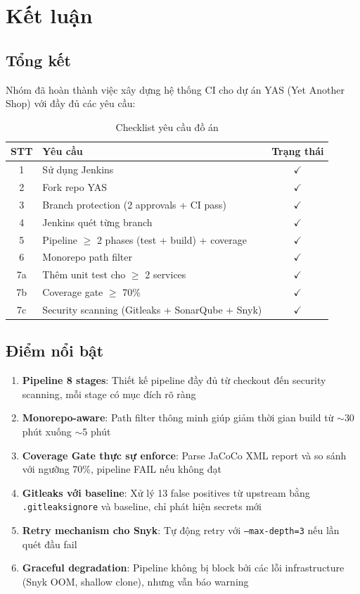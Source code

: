 \section{Kết luận}

\subsection{Tổng kết}
Nhóm đã hoàn thành việc xây dựng hệ thống CI cho dự án YAS (Yet Another Shop) với đầy đủ các yêu cầu:

\begin{table}[H]
\centering
\caption{Checklist yêu cầu đồ án}
\begin{tabular}{|c|l|c|}
\hline
\textbf{STT} & \textbf{Yêu cầu} & \textbf{Trạng thái} \\
\hline
1 & Sử dụng Jenkins & $\checkmark$ \\
\hline
2 & Fork repo YAS & $\checkmark$ \\
\hline
3 & Branch protection (2 approvals + CI pass) & $\checkmark$ \\
\hline
4 & Jenkins quét từng branch & $\checkmark$ \\
\hline
5 & Pipeline $\geq$ 2 phases (test + build) + coverage & $\checkmark$ \\
\hline
6 & Monorepo path filter & $\checkmark$ \\
\hline
7a & Thêm unit test cho $\geq$ 2 services & $\checkmark$ \\
\hline
7b & Coverage gate $\geq$ 70\% & $\checkmark$ \\
\hline
7c & Security scanning (Gitleaks + SonarQube + Snyk) & $\checkmark$ \\
\hline
\end{tabular}
\end{table}

\subsection{Điểm nổi bật}
\begin{enumerate}[noitemsep]
    \item \textbf{Pipeline 8 stages}: Thiết kế pipeline đầy đủ từ checkout đến security scanning, mỗi stage có mục đích rõ ràng
    \item \textbf{Monorepo-aware}: Path filter thông minh giúp giảm thời gian build từ $\sim$30 phút xuống $\sim$5 phút
    \item \textbf{Coverage Gate thực sự enforce}: Parse JaCoCo XML report và so sánh với ngưỡng 70\%, pipeline FAIL nếu không đạt
    \item \textbf{Gitleaks với baseline}: Xử lý 13 false positives từ upstream bằng \texttt{.gitleaksignore} và baseline, chỉ phát hiện secrets mới
    \item \textbf{Retry mechanism cho Snyk}: Tự động retry với \texttt{--max-depth=3} nếu lần quét đầu fail
    \item \textbf{Graceful degradation}: Pipeline không bị block bởi các lỗi infrastructure (Snyk OOM, shallow clone), nhưng vẫn báo warning
\end{enumerate}

